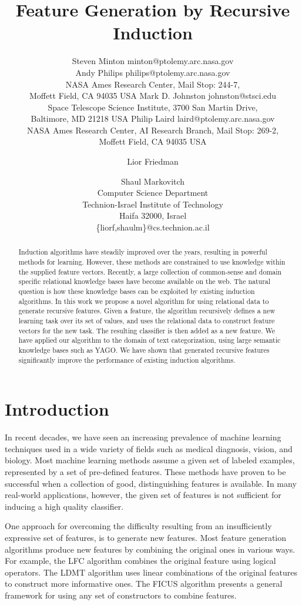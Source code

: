 \documentclass[twoside,11pt]{article}
\title{Feature Generation by Recursive Induction}
\author{\name Steven Minton \email minton@ptolemy.arc.nasa.gov \\
	\name Andy Philips \email philips@ptolemy.arc.nasa.gov \\
	\addr NASA Ames Research Center, Mail Stop: 244-7,\\
	Moffett Field, CA  94035 USA
	\AND
	\name Mark D. Johnston \email johnston@stsci.edu \\
	\addr Space Telescope Science Institute,
	3700 San Martin Drive,\\
	Baltimore, MD 21218 USA
	\AND
	\name Philip Laird \email laird@ptolemy.arc.nasa.gov \\
	\addr NASA Ames Research Center,
	AI Research Branch, Mail Stop: 269-2,\\
	Moffett Field, CA  94035 USA}
\author{Lior Friedman \and Shaul Markovitch\\
	Computer Science Department \\
	Technion-Israel Institute of Technology\\
	Haifa 32000, Israel\\
	\{liorf,shaulm\}@cs.technion.ac.il}
\theoremstyle{definition}
\begin{document}
\maketitle

\begin{abstract}
  Induction algorithms have steadily improved over the years, resulting in powerful methods for learning. However, these methods are constrained to use knowledge within the supplied feature vectors. Recently, a large collection of common-sense and domain specific relational knowledge bases have become available on the web. The natural question is how these knowledge bases can be exploited by existing induction algorithms.
  In this work we propose a novel algorithm for using relational data to generate recursive features. Given a feature, the algorithm recursively defines a new learning task over its set of values, and uses the relational data to construct feature vectors for the new task. The resulting classifier is then added as a new feature.
  We have applied our algorithm to the domain of text categorization, using large semantic knowledge bases such as YAGO. We have shown that generated recursive features significantly improve the performance of existing induction algorithms.
\end{abstract}

\section{Introduction}
\label{sec:Intro}
In recent decades, we have seen an increasing prevalence of machine learning techniques used in a wide variety of fields such as medical diagnosis, vision, and biology.
Most machine learning methods assume a given set of labeled examples, represented by a set of
pre-defined features. These methods have proven to be successful when a collection of good,
distinguishing features is available.
In many real-world applications, however, the given set of features is not sufficient for inducing a high quality classifier.

One approach for overcoming the difficulty resulting from an insufficiently expressive set of features, is to generate new features.  Most feature generation algorithms produce new features by combining the original ones in various ways.  For example, the LFC algorithm \citep{ragavan1993complex} combines the original feature using logical operators.  The LDMT algorithm \citep{utgo1991linear} uses linear combinations of the original features to construct more informative ones.  The FICUS algorithm \citep{markovitch2002feature} presents a general framework for using any set of constructors to combine features.
\end{document}
